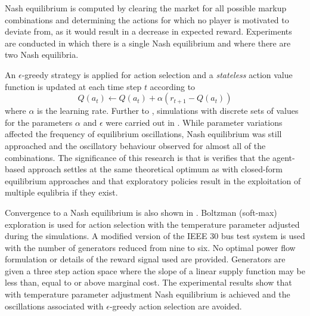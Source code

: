 Nash equilibrium is computed by clearing the market for all possible markup
combinations and determining the actions for which no player is motivated to
deviate from, as it would result in a decrease in expected reward. Experiments
are conducted in which there is a single Nash equilibrium and where there
are two Nash equilibria.

An $\epsilon$-greedy strategy is applied for action selection and a
\textit{stateless} action value function is updated at each time step $t$
according to
\begin{equation}
Q(a_t) \leftarrow Q(a_t) + \alpha(r_{t+1} - Q(a_t))
\end{equation}
where $\alpha$ is the learning rate.  Further to ,
simulations with discrete sets of values for the parameters $\alpha$ and
$\epsilon$ were carried out in .  While parameter
variations affected the frequency of equilibrium oscillations, Nash equilibrium
was still approached and the oscillatory behaviour observed for almost all
of the combinations.  The significance of this research is that is verifies
that the agent-based approach settles at the same theoretical optimum as with closed-form
equilibrium approaches and that exploratory policies result in the exploitation
of multiple equlibria if they exist.

Convergence to a Nash equilibrium is also shown in .
Boltzman (soft-max) exploration is used for action selection with the temperature
parameter adjusted during the simulations.  A modified version of the IEEE 30
bus test system is used with the number of generators reduced from nine to
six.  No optimal power flow formulation or details of the reward signal used
are provided.  Generators are given a three step action space where the slope of a
linear supply function may be less than, equal to or above marginal cost.  The
experimental results show that with temperature parameter adjustment Nash
equilibrium is achieved and the oscillations associated with $\epsilon$-greedy
action selection are avoided.

